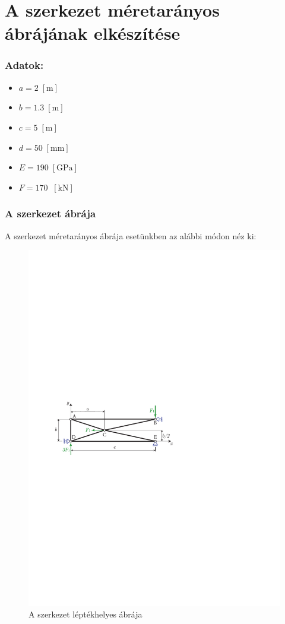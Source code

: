 \documentclass[12pt,a4paper]{article}
\def\m{\; \left[\mathrm{m}\right]}
\def\kN{\; \left[\mathrm{kN}\right]}
\begin{document}
\section{A szerkezet méretarányos ábrájának elkészítése}
\subsubsection*{Adatok:}
\begin{multicols}{2}
    \begin{itemize}
        \item $a=2 \m$
        \item $b=1.3 \m$
        \item $c=5 \m$
    \end{itemize}
    \columnbreak
    \begin{itemize}
        \item $d=50 \; \left[\mathrm{mm}\right]$
        \item $E=190 \; \left[\mathrm{GPa}\right]$
        \item $F=170 \; \kN$
    \end{itemize}
\end{multicols}
\subsubsection*{A szerkezet ábrája}
A szerkezet méretarányos ábrája esetünkben az alábbi módon néz ki:
\begin{figure}[H]
    \centering
    \includegraphics{vszhf1_abra.pdf}
    \caption{A szerkezet léptékhelyes ábrája}
\end{figure}
\end{document}
